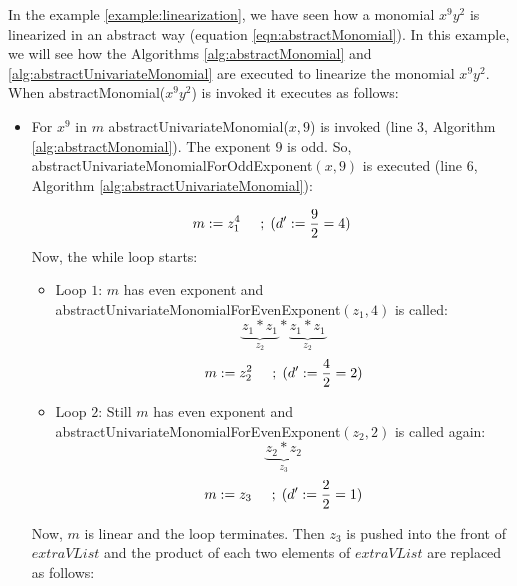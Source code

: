 \begin{example}
\label{example:abstractUnivariateMonomial}
    In the example \ref{example:linearization}, we have seen how a monomial $x^9y^2$ is linearized in an abstract way (equation \ref{eqn:abstractMonomial}).
    In this example, we will see how the Algorithms \ref{alg:abstractMonomial} and \ref{alg:abstractUnivariateMonomial} are executed to linearize the monomial $x^9y^2$.
    When abstractMonomial($x^9y^2$) is invoked it executes as follows: 
    \begin{itemize}
        \item For $x^9$ in $m$ abstractUnivariateMonomial($x, 9$) is invoked (line $3$, Algorithm \ref{alg:abstractMonomial}).
        The exponent $9$ is odd.
        So, abstractUnivariateMonomialForOddExponent$(x, 9)$ is executed (line $6$, Algorithm \ref{alg:abstractUnivariateMonomial}):
        
\tikzset{every picture/.style=remember picture}
\begin{figure}[H]
\centering
{}
\end{figure}
        
        $$m := z_{1}^4 \hspace{5mm} ;\hspace{1mm}(d^\prime := \frac{9}{2} = 4)$$
        Now, the while loop starts:
        \begin{itemize}
            \item Loop $1$: $m$ has even exponent and abstractUnivariateMonomialForEvenExponent$(z_{1}, 4)$ is called:
            $$\underbrace{ z_{1} \ast z_{1} }\limits_{z_{2}} \ast \underbrace{ z_{1} \ast z_{1} }\limits_{z_{2}}$$
            $$m := z_{2}^2 \hspace{5mm} ;\hspace{1mm}(d^\prime := \frac{4}{2} = 2)$$
            \item Loop $2$: Still $m$ has even exponent and abstractUnivariateMonomialForEvenExponent$(z_{2}, 2)$ is called again:
            $$\underbrace{ z_{2} \ast z_{2} }\limits_{z_{3}}$$
            $$m := z_{3} \hspace{5mm} ;\hspace{1mm}(d^\prime := \frac{2}{2} = 1)$$
        \end{itemize}
        Now, $m$ is linear and the loop terminates.
        Then $z_{3}$ is pushed into the front of $extraVList$ and the product of each two elements of $extraVList$ are replaced as follows:
        

\end{itemize}
\end{example}
